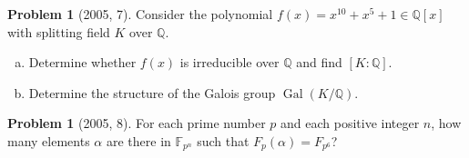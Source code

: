 \documentclass{article}
\newcommand{\inv}{^{-1}}
\newcommand{\<}{\langle} %
\renewcommand{\>}{\rangle} %
\DeclareMathOperator{\Gal}{Gal}
\DeclareMathOperator{\Aut}{Aut}
\theoremstyle{plain}
\theoremstyle{remark}
\theoremstyle{definition}
\newtheorem{examproblem}[equation]{Problem}
\begin{document}
\begin{examproblem}[2005, 7]
	Consider the polynomial $f(x)=x^{10}+x^5+1\in\mathbb Q[x]$ with
	splitting field $K$ over $\mathbb Q$.
	\begin{enumerate}[(a)]
		\item Determine whether $f(x)$ is irreducible over $\mathbb Q$ and find
			$[K:\mathbb Q]$.
		\item Determine the structure of the Galois group
			$\Gal(K/\mathbb Q)$.
	\end{enumerate}
\end{examproblem}

\begin{examproblem}[2005, 8]
	For each prime number $p$ and each positive integer $n$, how many
	elements $\alpha$ are there in $\mathbb F_{p^n}$ such that
	$F_p(\alpha)=F_{p^6}$?
\end{examproblem}

\begin{comment}
\section{Other Problems}
The exercises in Dummit and Foote section 4.4, 4.5, and 5.5 seem to cover
everything that could come up related to classifying groups of a given order.
In particular, most of the exercises in 5.5 seem quite important. Also, exercises
12-41 in Lang.

\begin{examproblem}[Dummit and Foote 5.5.6.]
	Assume that $K$ is a cyclic group, $H$ is an arbitrary group, and $\varphi_1$
	and $\varphi_2$ are homomorphisms from $K$ into $\Aut(H)$ such that
	$\varphi_1(K)$ and $\varphi_2(K)$ are conjugate subgroups
	of $\Aut(H)$. Prove by constructing an explicit isomorphism that
	$H\rtimes_{\varphi_1}K\cong H\rtimes_{\varphi_2} K$.
	[Suppose $\sigma_{\varphi_1}(K)\sigma\inv=\varphi_2(K)$
	so that for some $a\in\mathbb Z$ we have $\sigma\varphi_1(k)\sigma\inv
	=\varphi_2(k)^a$ for all $k\in K$. Show that the map $\psi:H
	\rtimes_{\varphi_1}K\rightarrow H\rtimes_{\varphi_2}K$
	defined by $\psi((h,k))=(\sigma(h),k^a)$ is a homomorphism.
	Show $\psi$ is bijective by construcing a 2-sided inverse.]
\end{examproblem}
\end{comment}
\end{document}
